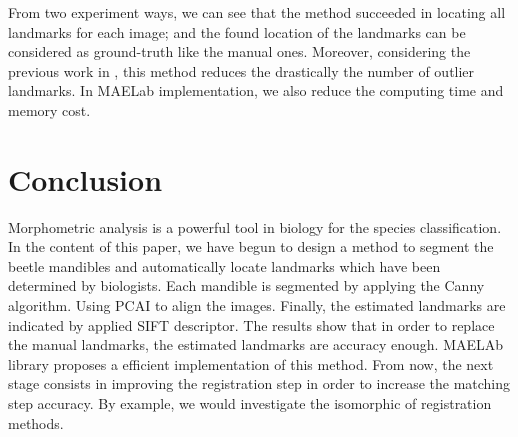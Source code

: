 \documentclass[twoside,twocolumn,10pt]{article}
\begin{document}
From two experiment ways, we can see that the method succeeded in locating 
all landmarks for each image; and the found location of the
landmarks can be considered as ground-truth like the manual ones. Moreover, considering the previous work in \cite{leestimating}, this method reduces the drastically the number of outlier landmarks. In MAELab implementation, we also reduce the computing time and memory cost.

\section{Conclusion}
Morphometric analysis is a powerful tool in biology for the species  classification. In the content of this paper, we
have begun to design a method to segment the beetle mandibles and automatically locate landmarks which have been determined by
biologists. Each mandible is segmented by applying the Canny
algorithm. Using PCAI to align the images. Finally, the estimated landmarks are indicated by applied SIFT descriptor. The results show that in order to replace the manual landmarks, the estimated landmarks are accuracy enough. MAELAb library proposes a efficient implementation of this method. From now, the next stage consists in improving the registration step in order to increase the matching step accuracy. By example, we would investigate the isomorphic of registration methods.




\end{document}
